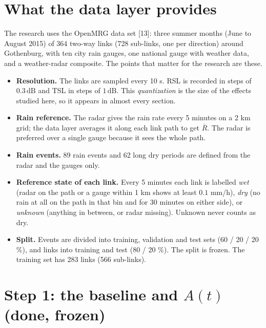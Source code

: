 \documentclass[11pt,a4paper]{article}
\newcommand{\Rbar}{\bar{R}}
\newcommand{\dB}{\,\mathrm{dB}}
\begin{document}
\section{What the data layer provides}
\label{sec:data}

The research uses the OpenMRG data set [13]: three summer months (June to August 2015) of 364 two-way links (728
sub-links, one per direction) around Gothenburg, with ten city rain gauges, one national gauge with weather data, and
a weather-radar composite. The points that matter for the research are these.

\begin{itemize}
\item \textbf{Resolution.} The links are sampled every 10 s. RSL is recorded in steps of $0.3\dB$ and TSL in steps of
$1\dB$. This \emph{quantization} is the size of the effects studied here, so it appears in almost every section.
\item \textbf{Rain reference.} The radar gives the rain rate every 5 minutes on a 2 km grid; the data layer averages
it along each link path to get $\Rbar$. The radar is preferred over a single gauge because it sees the whole path.
\item \textbf{Rain events.} 89 rain events and 62 long dry periods are defined from the radar and the gauges only.
\item \textbf{Reference state of each link.} Every 5 minutes each link is labelled \emph{wet} (radar on the path or a
gauge within 1 km shows at least $0.1$ mm/h), \emph{dry} (no rain at all on the path in that bin and for 30 minutes
on either side), or \emph{unknown} (anything in between, or radar missing). Unknown never counts as dry.
\item \textbf{Split.} Events are divided into training, validation and test sets (60 / 20 / 20 \%), and links into
training and test (80 / 20 \%). The split is frozen. The training set has 283 links (566 sub-links).
\end{itemize}

\section{Step 1: the baseline and $A(t)$ (done, frozen)}
\label{sec:baseline}
\end{document}
